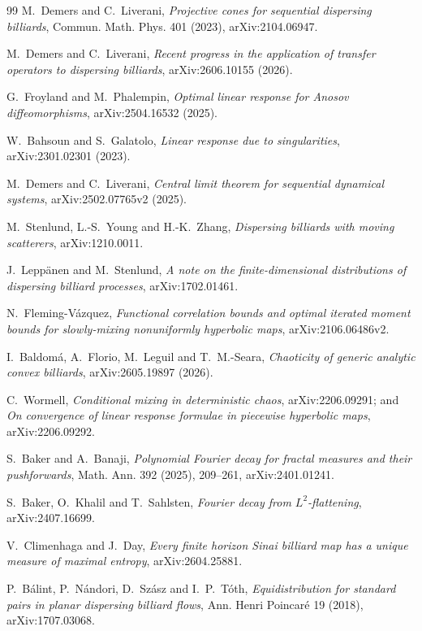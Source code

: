 \documentclass[11pt]{article}
\begin{document}
\begingroup\raggedright
\begin{thebibliography}{99}
M.~Demers and C.~Liverani,
\emph{Projective cones for sequential dispersing billiards},
Commun. Math. Phys. 401 (2023), arXiv:2104.06947.

M.~Demers and C.~Liverani,
\emph{Recent progress in the application of transfer operators to dispersing
billiards}, arXiv:2606.10155 (2026).

G.~Froyland and M.~Phalempin,
\emph{Optimal linear response for Anosov diffeomorphisms},
arXiv:2504.16532 (2025).

W.~Bahsoun and S.~Galatolo,
\emph{Linear response due to singularities}, arXiv:2301.02301 (2023).

M.~Demers and C.~Liverani,
\emph{Central limit theorem for sequential dynamical systems},
arXiv:2502.07765v2 (2025).

M.~Stenlund, L.-S.~Young and H.-K.~Zhang,
\emph{Dispersing billiards with moving scatterers},
arXiv:1210.0011.

J.~Lepp\"anen and M.~Stenlund,
\emph{A note on the finite-dimensional distributions of dispersing billiard processes},
arXiv:1702.01461.

N.~Fleming-V\'azquez,
\emph{Functional correlation bounds and optimal iterated moment bounds for
slowly-mixing nonuniformly hyperbolic maps}, arXiv:2106.06486v2.

I.~Baldom\'a, A.~Florio, M.~Leguil and T.~M.-Seara,
\emph{Chaoticity of generic analytic convex billiards},
arXiv:2605.19897 (2026).

C.~Wormell,
\emph{Conditional mixing in deterministic chaos},
arXiv:2206.09291; and
\emph{On convergence of linear response formulae in piecewise hyperbolic maps},
arXiv:2206.09292.

S.~Baker and A.~Banaji,
\emph{Polynomial Fourier decay for fractal measures and their pushforwards},
Math. Ann. 392 (2025), 209--261, arXiv:2401.01241.

S.~Baker, O.~Khalil and T.~Sahlsten,
\emph{Fourier decay from $L^2$-flattening},
arXiv:2407.16699.

V.~Climenhaga and J.~Day,
\emph{Every finite horizon Sinai billiard map has a unique measure of maximal entropy},
arXiv:2604.25881.

P.~B\'alint, P.~N\'andori, D.~Sz\'asz and I.~P.~T\'oth,
\emph{Equidistribution for standard pairs in planar dispersing billiard flows},
Ann. Henri Poincar\'e 19 (2018), arXiv:1707.03068.


\end{thebibliography}
\end{document}
